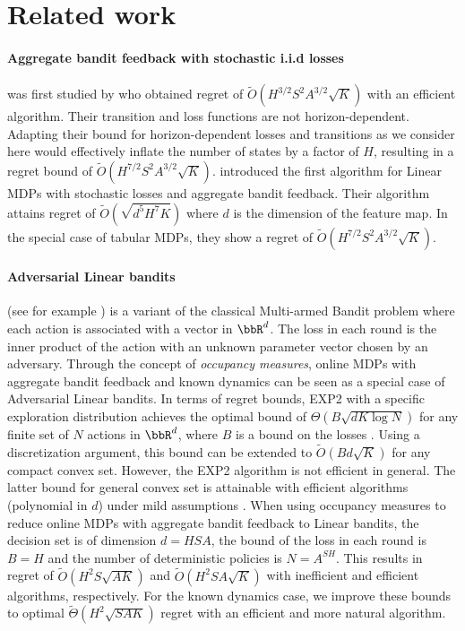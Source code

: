 \section{Related work}
\paragraph{\bf Aggregate bandit feedback with stochastic i.i.d losses\hspace{-0.5em}} was first studied by \citet{efroni2021reinforcement} who obtained regret of $\tilde O(H^{3/2}S^2 A^{3/2} \sqrt{K})$ with an efficient algorithm. Their transition and loss functions are not horizon-dependent. Adapting their bound for horizon-dependent losses and transitions as we consider here would effectively inflate the number of states by a factor of $H$, resulting in a regret bound of $\tilde O(H^{7/2} S^2 A^{3/2} \sqrt{K})$. \citet{cassel2024near} introduced the first algorithm for Linear MDPs with stochastic losses and aggregate bandit feedback. Their algorithm attains regret of $\tilde O(\sqrt{d^5 H^7 K})$ where $d$ is the dimension of the feature map. In the special case of tabular MDPs, they show a regret of $\tilde O (H^{7/2} S^2 A^{3/2} \sqrt{K})$.

\paragraph{\bf Adversarial Linear bandits\hspace{-0.5em}} (see for example \citet{lattimore2020bandit}) is a variant of the classical Multi-armed Bandit problem where each action is associated with a vector in $\bbR^d$. The loss in each round is the inner product of the action with an unknown parameter vector chosen by an adversary. Through the concept of \textit{occupancy measures}, online MDPs with aggregate bandit feedback and known dynamics can be seen as a special case of Adversarial Linear bandits. In terms of regret bounds,
EXP2 \citep{dani2007price,cesa2012combinatorial} with a specific exploration distribution achieves the optimal bound of $\Theta(B \sqrt {dK \log N})$ for any finite set of $N$ actions in $\bbR^d$, where $B$ is a bound on the losses \citep{bubeck2012towards}. 
Using a discretization argument, this bound can be extended to $\tilde O(B d \sqrt{K})$ for any compact convex set. However, the EXP2 algorithm is not efficient in general.
% 
The latter bound for general convex set is attainable with efficient algorithms (polynomial in $d$) under mild assumptions \citep{hazan2016volumetric}. When using occupancy measures to reduce online MDPs with aggregate bandit feedback to Linear bandits, the decision set is of dimension $d = HSA$, the bound of the loss in each round is $B=H$ and the number of deterministic policies is $N = A^{SH}$. This results in regret of $\tilde O(H^2 S \sqrt{A K})$ and $\tilde O(H^2 S A \sqrt{K})$ with inefficient and efficient algorithms, respectively. For the known dynamics case, we improve these bounds to optimal $\tilde \Theta(H^2  \sqrt{S A K})$ regret with an efficient and more natural algorithm.

